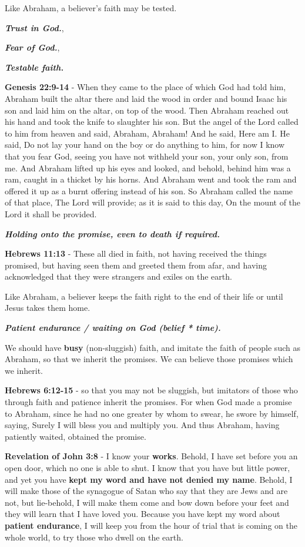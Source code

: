 \documentclass[11pt]{article}
\begin{document}
Like Abraham, a believer's faith may be tested.

\emph{\textbf{Trust in God.}},

\emph{\textbf{Fear of God.}},

\emph{\textbf{Testable faith.}}

\textbf{Genesis 22:9-14} - When they came to the place of which God had told him, Abraham built the altar there and laid the wood in order and bound Isaac his son and laid him on the altar, on top of the wood.  Then Abraham reached out his hand and took the knife to slaughter his son.  But the angel of the Lord called to him from heaven and said, Abraham, Abraham! And he said, Here am I.  He said, Do not lay your hand on the boy or do anything to him, for now I know that you fear God, seeing you have not withheld your son, your only son, from me.  And Abraham lifted up his eyes and looked, and behold, behind him was a ram, caught in a thicket by his horns. And Abraham went and took the ram and offered it up as a burnt offering instead of his son.  So Abraham called the name of that place, The Lord will provide; as it is said to this day, On the mount of the Lord it shall be provided.

\emph{\textbf{Holding onto the promise, even to death if required.}}

\textbf{Hebrews 11:13} - These all died in faith, not having received the things promised, but having seen them and greeted them from afar, and having acknowledged that they were strangers and exiles on the earth.

Like Abraham, a believer keeps the faith right to the end of their life or until Jesus takes them home.

\emph{\textbf{Patient endurance / waiting on God (belief * time).}}

We should have \textbf{busy} (non-sluggish) faith,
and imitate the faith of people such as
Abraham, so that we inherit the promises.
We can believe those promises which we inherit.

\textbf{Hebrews 6:12-15} - so that you may not be sluggish, but imitators of those who through faith and patience inherit the promises.  For when God made a promise to Abraham, since he had no one greater by whom to swear, he swore by himself, saying, Surely I will bless you and multiply you.  And thus Abraham, having patiently waited, obtained the promise.

\textbf{Revelation of John 3:8} - I know your \textbf{works}. Behold, I have set before you an open door, which no one is able to shut. I know that you have but little power, and yet you have \textbf{kept my word and have not denied my name}.  Behold, I will make those of the synagogue of Satan who say that they are Jews and are not, but lie-behold, I will make them come and bow down before your feet and they will learn that I have loved you.  Because you have kept my word about \textbf{patient endurance}, I will keep you from the hour of trial that is coming on the whole world, to try those who dwell on the earth.
\end{document}
